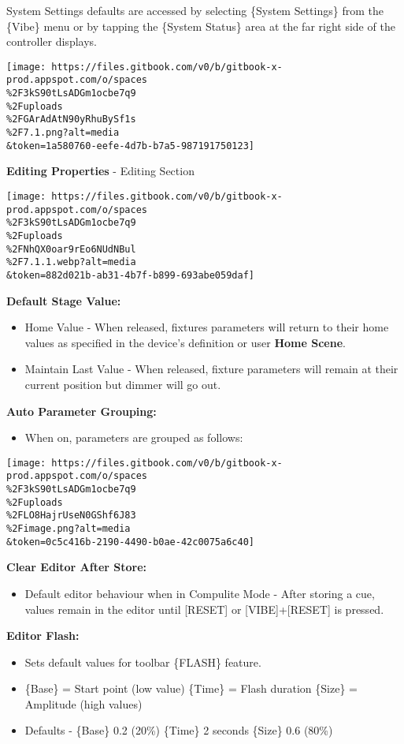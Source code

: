 \documentclass[
]{article}
\providecommand{\tightlist}{%
  \setlength{\itemsep}{0pt}\setlength{\parskip}{0pt}}
\begin{document}
System Settings defaults are accessed by selecting \{System Settings\} from the \{Vibe\} menu or by tapping the \{System Status\} area at the far right side of the controller displays.

\texttt{[image: https://files.gitbook.com/v0/b/gitbook-x-prod.appspot.com/o/spaces\\\%2F3kS90tLsADGm1ocbe7q9\\\%2Fuploads\\\%2FGArAdAtN90yRhuBySf1s\\\%2F7.1.png?alt=media\\\&token=1a580760-eefe-4d7b-b7a5-987191750123]}

\textbf{Editing Properties} - Editing Section

\texttt{[image: https://files.gitbook.com/v0/b/gitbook-x-prod.appspot.com/o/spaces\\\%2F3kS90tLsADGm1ocbe7q9\\\%2Fuploads\\\%2FNhQX0oar9rEo6NUdNBul\\\%2F7.1.1.webp?alt=media\\\&token=882d021b-ab31-4b7f-b899-693abe059daf]}

\textbf{Default Stage Value:}

\begin{itemize}
\item
  Home Value - When released, fixtures parameters will return to their home values as specified in the device's definition or user \textbf{Home Scene}.
\item
  Maintain Last Value - When released, fixture parameters will remain at their current position but dimmer will go out.
\end{itemize}

\textbf{Auto Parameter Grouping:}

\begin{itemize}
\tightlist
\item
  When on, parameters are grouped as follows:
\end{itemize}

\texttt{[image: https://files.gitbook.com/v0/b/gitbook-x-prod.appspot.com/o/spaces\\\%2F3kS90tLsADGm1ocbe7q9\\\%2Fuploads\\\%2FLO8HajrUseN0GShf6J83\\\%2Fimage.png?alt=media\\\&token=0c5c416b-2190-4490-b0ae-42c0075a6c40]}

\textbf{Clear Editor After Store:}

\begin{itemize}
\tightlist
\item
  Default editor behaviour when in Compulite Mode - After storing a cue, values remain in the editor until {[}RESET{]} or {[}VIBE{]}+{[}RESET{]} is pressed.
\end{itemize}

\textbf{Editor Flash:}

\begin{itemize}
\item
  Sets default values for toolbar \{FLASH\} feature.
\item
  \{Base\} = Start point (low value) \{Time\} = Flash duration \{Size\} = Amplitude (high values)
\item
  Defaults - \{Base\} 0.2 (20\%) \{Time\} 2 seconds \{Size\} 0.6 (80\%)
\end{itemize}
\end{document}
